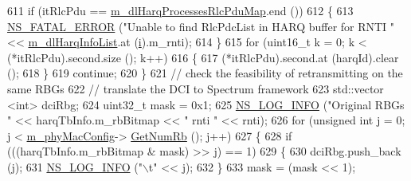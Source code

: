 \begin{DoxyCode}
{611                                         \textcolor{keywordflow}{if} (itRlcPdu == 
      \hyperlink{classns3_1_1MmWaveRrMacScheduler_a51e5c8d3c34be4e070f2fb3e621cd418}{m\_dlHarqProcessesRlcPduMap}.end ())
612                                         \{
613                                                 \hyperlink{group__fatal_ga5131d5e3f75d7d4cbfd706ac456fdc85}{NS\_FATAL\_ERROR} (\textcolor{stringliteral}{"Unable to find RlcPdcList in
       HARQ buffer for RNTI "} << \hyperlink{classns3_1_1MmWaveRrMacScheduler_a1b1043d7f9994e2ee6a7e1b368e9d7a1}{m\_dlHarqInfoList}.at (\hyperlink{bernuolliDistribution_8m_a6f6ccfcf58b31cb6412107d9d5281426}{i}).m\_rnti);
614                                         \}
615                                         \textcolor{keywordflow}{for} (uint16\_t k = 0; k < (*itRlcPdu).second.size (); k++)
616                                         \{
617                                                 (*itRlcPdu).second.at (harqId).clear ();
618                                         \}
619                                         \textcolor{keywordflow}{continue};
620                                 \}
621                                 \textcolor{comment}{// check the feasibility of retransmitting on the same RBGs}
622                                 \textcolor{comment}{// translate the DCI to Spectrum framework}
623                                 std::vector <int> dciRbg;
624                                 uint32\_t mask = 0x1;
625                                 \hyperlink{group__logging_gafbd73ee2cf9f26b319f49086d8e860fb}{NS\_LOG\_INFO} (\textcolor{stringliteral}{"Original RBGs "} << harqTbInfo.m\_rbBitmap << \textcolor{stringliteral}{" rnti
       "} << rnti);
626                                 \textcolor{keywordflow}{for} (\textcolor{keywordtype}{unsigned} \textcolor{keywordtype}{int} j = 0; j < \hyperlink{classns3_1_1MmWaveMacScheduler_a24d7af4971d2e500fe543cefbafa2fd9}{m\_phyMacConfig}->
      \hyperlink{classns3_1_1MmWavePhyMacCommon_a4c5f323fd722d6eec52efda5d76f97ad}{GetNumRb} (); j++)
627                                 \{
628                                         \textcolor{keywordflow}{if} (((harqTbInfo.m\_rbBitmap & mask) >> j) == 1)
629                                         \{
630                                                 dciRbg.push\_back (j);
631                                                 \hyperlink{group__logging_gafbd73ee2cf9f26b319f49086d8e860fb}{NS\_LOG\_INFO} (\textcolor{stringliteral}{"\(\backslash\)t"} << j);
632                                         \}
633                                         mask = (mask << 1);
}
\end{DoxyCode}
